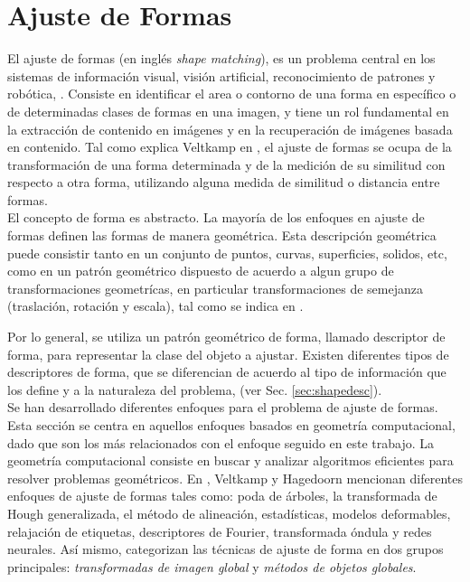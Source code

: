 \section{Ajuste de Formas}
\label{sec:shapefitting}

El ajuste de formas (en ingl\'es \emph{shape matching}), es un problema
central en los sistemas de informaci\'on visual, visi\'on artificial, 
reconocimiento de patrones y rob\'otica, \cite{matchingbook}. Consiste
en identificar el area o contorno de una forma en espec\'ifico o de determinadas 
clases de formas en una imagen, y tiene un rol fundamental en la extracci\'on
de contenido en im\'agenes y en la recuperaci\'on de im\'agenes basada en contenido.
Tal como explica Veltkamp en \cite{matching2}, el ajuste de formas 
se ocupa de la transformaci\'on de una forma determinada y de la
medici\'on de su similitud con respecto a otra forma, utilizando
alguna medida de similitud o distancia entre formas.\\

El concepto de forma es abstracto. La mayor\'ia de los
enfoques en ajuste de formas definen las formas de manera 
geom\'etrica. Esta descripci\'on geom\'etrica puede 
consistir tanto en un conjunto de puntos, curvas, superficies,
solidos, etc, como en un patr\'on geom\'etrico dispuesto de acuerdo
a algun grupo de transformaciones geometr\'icas, en particular transformaciones
de semejanza (traslaci\'on, rotaci\'on y escala), tal como se indica en
\cite{matching2}. 

Por lo general, se utiliza un patr\'on geom\'etrico de forma, llamado
descriptor de forma, para representar la clase del objeto a ajustar.
Existen diferentes tipos de descriptores de forma, que se diferencian de acuerdo
al tipo de informaci\'on que los define y a la naturaleza del problema, (ver
Sec. \ref{sec:shapedesc}).\\

Se han desarrollado diferentes enfoques para el problema de ajuste de formas.
Esta secci\'on se centra en aquellos enfoques basados en geometr\'ia
computacional, dado que son los m\'as relacionados con el enfoque
seguido en este trabajo. La geometr\'ia computacional consiste en buscar y 
analizar algoritmos eficientes para resolver problemas geom\'etricos.
En \cite{matchingbook}, Veltkamp y Hagedoorn mencionan diferentes
enfoques de ajuste de formas tales como: poda de \'arboles, la transformada
de Hough generalizada, el m\'etodo de alineaci\'on, estad\'isticas,
modelos deformables, relajaci\'on de etiquetas, descriptores de Fourier,
transformada \'ondula y redes neurales. As\'i mismo, categorizan las 
t\'ecnicas de ajuste de forma en dos grupos principales:
\emph{transformadas de imagen global} y \emph{m\'etodos de objetos globales}.\\

